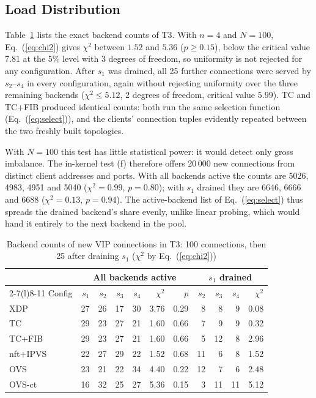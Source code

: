 \documentclass[conference]{IEEEtran}
\begin{document}
\subsection{Load Distribution}
Table~\ref{tab:dist} lists the exact backend counts of T3. With $n=4$ and
$N=100$, Eq.~(\ref{eq:chi2}) gives $\chi^2$ between $1.52$ and $5.36$
($p \ge 0.15$), below the critical value $7.81$ at the 5\% level with 3
degrees of freedom, so uniformity is not rejected for any configuration.
After $s_1$ was drained, all 25 further connections were served by
$s_2$--$s_4$ in every configuration, again without rejecting uniformity over
the three remaining backends ($\chi^2 \le 5.12$, 2 degrees of freedom,
critical value $5.99$). TC and TC+FIB produced identical counts: both run the
same selection function (Eq.~(\ref{eq:select})), and the clients' connection
tuples evidently repeated between the two freshly built topologies.

With $N=100$ this test has little statistical power: it would detect only
gross imbalance. The in-kernel test (f) therefore offers 20\,000 new
connections from distinct client addresses and ports. With all backends
active the counts are 5026, 4983, 4951 and 5040 ($\chi^2=0.99$, $p=0.80$);
with $s_1$ drained they are 6646, 6666 and 6688 ($\chi^2=0.13$, $p=0.94$).
The active-backend list of Eq.~(\ref{eq:select}) thus spreads the drained
backend's share evenly, unlike linear probing, which would hand it entirely to
the next backend in the pool.

\begin{table}[t]
\caption{Backend counts of new VIP connections in T3: 100 connections, then
25 after draining $s_1$ ($\chi^2$ by Eq.~(\ref{eq:chi2}))}
\label{tab:dist}
\centering\scriptsize
\setlength{\tabcolsep}{2.6pt}
\begin{tabular}{@{}lrrrrrrrrrr@{}}
\toprule
 & \multicolumn{6}{c}{All backends active} & \multicolumn{4}{c}{$s_1$ drained} \\
\cmidrule(lr){2-7}\cmidrule(l){8-11}
Config & $s_1$ & $s_2$ & $s_3$ & $s_4$ & $\chi^2$ & $p$ & $s_2$ & $s_3$ & $s_4$ & $\chi^2$ \\
\midrule
XDP      & 27 & 26 & 17 & 30 & 3.76 & 0.29 & 8  & 8  & 9  & 0.08 \\
TC       & 29 & 23 & 27 & 21 & 1.60 & 0.66 & 7  & 9  & 9  & 0.32 \\
TC+FIB   & 29 & 23 & 27 & 21 & 1.60 & 0.66 & 5  & 12 & 8  & 2.96 \\
nft+IPVS & 22 & 27 & 29 & 22 & 1.52 & 0.68 & 11 & 6  & 8  & 1.52 \\
OVS      & 23 & 21 & 22 & 34 & 4.40 & 0.22 & 12 & 7  & 6  & 2.48 \\
OVS-ct   & 16 & 32 & 25 & 27 & 5.36 & 0.15 & 3  & 11 & 11 & 5.12 \\
\bottomrule
\end{tabular}
\end{table}
\end{document}
